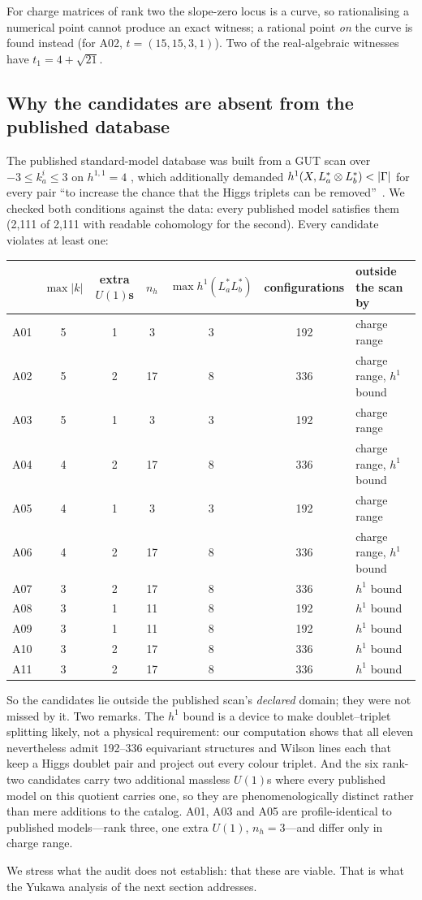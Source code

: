 For charge matrices of rank two the slope-zero locus is a curve, so rationalising
a numerical point cannot produce an exact witness; a rational point \emph{on}
the curve is found instead (for A02, $t=(15,15,3,1)$). Two of the real-algebraic
witnesses have $t_1=4+\sqrt{21}$.

\subsection{Why the candidates are absent from the published database}

The published standard-model database was built from a GUT scan over
$-3\le k_a^i\le3$ on $h^{1,1}=4$ \cite[Sec.~5.3]{AGLP2012}, which additionally
demanded $h^1(X,L_a^*\otimes L_b^*)<|\Gam|$ for every pair ``to increase the
chance that the Higgs triplets can be removed''~\cite{AGLP2011}. We checked both
conditions against the data: every published model satisfies them (2,111 of
2,111 with readable cohomology for the second). Every candidate violates at
least one:

\begin{center}\footnotesize
\setlength{\tabcolsep}{4pt}
\begin{tabular}{@{}lcccccl@{}}
\toprule
 & $\max|k|$ & extra $U(1)$s & $n_h$ & $\max h^1(L_a^*L_b^*)$ & configurations & outside the scan by \\
\midrule
A01 & 5 & 1 & 3 & 3 & 192 & charge range \\
A02 & 5 & 2 & 17 & 8 & 336 & charge range, $h^1$ bound \\
A03 & 5 & 1 & 3 & 3 & 192 & charge range \\
A04 & 4 & 2 & 17 & 8 & 336 & charge range, $h^1$ bound \\
A05 & 4 & 1 & 3 & 3 & 192 & charge range \\
A06 & 4 & 2 & 17 & 8 & 336 & charge range, $h^1$ bound \\
A07 & 3 & 2 & 17 & 8 & 336 & $h^1$ bound \\
A08 & 3 & 1 & 11 & 8 & 192 & $h^1$ bound \\
A09 & 3 & 1 & 11 & 8 & 192 & $h^1$ bound \\
A10 & 3 & 2 & 17 & 8 & 336 & $h^1$ bound \\
A11 & 3 & 2 & 17 & 8 & 336 & $h^1$ bound \\
\bottomrule
\end{tabular}
\end{center}

So the candidates lie outside the published scan's \emph{declared} domain; they
were not missed by it. Two remarks. The $h^1$ bound is a device to make
doublet--triplet splitting likely, not a physical requirement: our
computation shows that all eleven nevertheless admit 192--336 equivariant
structures and Wilson lines each that keep a Higgs doublet pair and project out
every colour triplet. And the six rank-two candidates carry two
additional massless $U(1)$s where every published model on this quotient carries
one, so they are phenomenologically distinct rather than mere additions to the
catalog. A01, A03 and A05 are profile-identical to published models---rank
three, one extra $U(1)$, $n_h=3$---and differ only in charge range.

We stress what the audit does not establish: that these are viable. That is what
the Yukawa analysis of the next section addresses.
